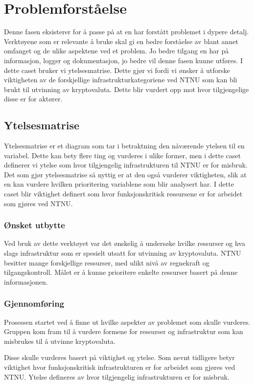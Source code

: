 \chapter{Problemforståelse}
Denne fasen eksisterer for å passe på at en har forstått problemet i dypere detalj. Verktøyene som er relevante å bruke skal gi en bedre forståelse av blant annet omfanget og de ulike aspektene ved et problem. Jo bedre tilgang en har på informasjon, logger og dokumentasjon, jo bedre vil denne fasen kunne utføres. I dette caset bruker vi ytelsesmatrise. Dette gjør vi fordi vi ønsker å utforske viktigheten av de forskjellige infrastrukturkategoriene ved NTNU som kan bli brukt til utvinning av kryptovaluta. Dette blir vurdert opp mot hvor tilgjengelige disse er for aktører. 


\section{Ytelsesmatrise}
Ytelsesmatrise er et diagram som tar i betraktning den nåværende ytelsen til en variabel. Dette kan bety flere ting og vurderes i ulike former, men i dette caset definerer vi ytelse som hvor tilgjengelig infrastrukturen til NTNU er for misbruk. Det som gjør ytelsesmatrise så nyttig er at den også vurderer viktigheten, slik at en kan vurdere hvilken prioritering variablene som blir analysert har. I dette caset blir viktighet definert som hvor funksjonskritisk ressursene er for arbeidet som gjøres ved NTNU.

\subsection{Ønsket utbytte}
Ved bruk av dette verktøyet var det ønskelig å undersøke hvilke ressurser og hva slags infrastruktur som er spesielt utsatt for utvinning av kryptovaluta. NTNU besitter mange forskjellige ressurser, med ulikt nivå av regnekraft og tilgangskontroll. Målet er å kunne prioritere enkelte ressurser basert på denne informasjonen. 

\subsection{Gjennomføring}
Prosessen startet ved å finne ut hvilke aspekter av problemet som skulle vurderes. Gruppen kom fram til å vurdere formene for ressurser og infrastruktur som kan misbrukes til å utvinne kryptovaluta. 

Disse skulle vurderes basert på viktighet og ytelse. Som nevnt tidligere betyr viktighet hvor funksjonskritisk infrastrukturen er for arbeidet som gjøres ved NTNU. Ytelse defineres av hvor tilgjengelig infrastrukturen er for misbruk. 

